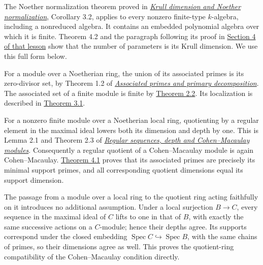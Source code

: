 \documentclass[
  11pt,
  a4paper,
]{article}
\begin{document}
The Noether normalization theorem proved in
\href{https://kokunoyumeto.github.io/open-math-courses-public/courses/AG-CA/krull-dimension-and-noether-normalization.html\#3-normalization-that-respects-ideals}{\emph{Krull
dimension and Noether normalization}}, Corollary 3.2, applies to every
nonzero finite-type \(k\)-algebra, including a nonreduced algebra. It
contains an embedded polynomial algebra over which it is finite. Theorem
4.2 and the paragraph following its proof in
\href{https://kokunoyumeto.github.io/open-math-courses-public/courses/AG-CA/krull-dimension-and-noether-normalization.html\#4-parameters-measure-dimension-and-height}{Section
4 of that lesson} show that the number of parameters is its Krull
dimension. We use this full form below.

For a module over a Noetherian ring, the union of its associated primes
is its zero-divisor set, by Theorem 1.2 of
\href{https://kokunoyumeto.github.io/open-math-courses-public/courses/AG-CA/associated-primes-and-primary-decomposition.html\#1-annihilators-that-are-prime}{\emph{Associated
primes and primary decomposition}}. The associated set of a finite
module is finite by
\href{https://kokunoyumeto.github.io/open-math-courses-public/courses/AG-CA/associated-primes-and-primary-decomposition.html\#2-exact-sequences-and-finite-control}{Theorem
2.2}. Its localization is described in
\href{https://kokunoyumeto.github.io/open-math-courses-public/courses/AG-CA/associated-primes-and-primary-decomposition.html\#3-localizing-the-associated-points}{Theorem
3.1}.

For a nonzero finite module over a Noetherian local ring, quotienting by
a regular element in the maximal ideal lowers both its dimension and
depth by one. This is Lemma 2.1 and Theorem 2.3 of
\href{https://kokunoyumeto.github.io/open-math-courses-public/courses/AG-CA/regular-sequences-depth-and-cohen-macaulay-modules.html\#2-depth-and-its-homological-measurement}{\emph{Regular
sequences, depth and Cohen--Macaulay modules}}. Consequently a regular
quotient of a Cohen--Macaulay module is again Cohen--Macaulay.
\href{https://kokunoyumeto.github.io/open-math-courses-public/courses/AG-CA/regular-sequences-depth-and-cohen-macaulay-modules.html\#4-when-dimension-detects-regularity}{Theorem
4.1} proves that its associated primes are precisely its minimal support
primes, and all corresponding quotient dimensions equal its support
dimension.

The passage from a module over a local ring to the quotient ring acting
faithfully on it introduces no additional assumption. Under a local
surjection \(B\to C\), every sequence in the maximal ideal of \(C\)
lifts to one in that of \(B\), with exactly the same successive actions
on a \(C\)-module; hence their depths agree. Its supports correspond
under the closed embedding
\(\operatorname{Spec}C\hookrightarrow\operatorname{Spec}B\), with the
same chains of primes, so their dimensions agree as well. This proves
the quotient-ring compatibility of the Cohen--Macaulay condition
directly.
\end{document}
